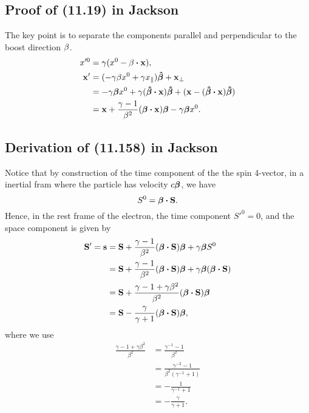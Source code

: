 \documentclass[10pt]{article}
\begin{document}
\subsection{Proof of (11.19) in Jackson}
The key point is to separate the components parallel and perpendicular to the boost direction $\vb{\beta}$.
\begin{align*}
	x'^0 &= \gamma (x^0 - \vb{\beta} \vdot \vb{x}), \\
	\vb{x'} &= (- \gamma \beta x^0 + \gamma x_{\parallel}) \vu*{\beta} + \vb{x}_{\perp} \\
	&= -\gamma \vb*{\beta} x^0 + \gamma (\vu*{\beta} \vdot \vb{x}) \vu*{\beta} + (\vb{x} - (\vu*{\beta} \vdot \vb{x}) \vu*{\beta}) \\
	&= \vb{x} + \frac{\gamma - 1}{\beta^2} (\vb*{\beta} \vdot \vb{x}) \vb*{\beta} - \gamma \vb*{\beta} x^0.
\end{align*}

\subsection{Derivation of (11.158) in Jackson}
Notice that by construction of the time component of the the spin 4-vector, in a inertial fram where the particle has velocity $c \vb*{\beta}$, we have
\begin{equation}
	S^0 = \vb*{\beta} \vdot \vb{S}.
\end{equation}
Hence, in the rest frame of the electron, the time component $S'^0 = 0$, and the space component is given by
\begin{align*}
	\vb{S'} = \vb{s} &= \vb{S} + \frac{\gamma - 1}{\beta^2} (\vb*{\beta} \vdot \vb{S}) \vb*{\beta} + \gamma \vb*{\beta} S^0 \\
	&= \vb{S} + \frac{\gamma - 1}{\beta^2} (\vb*{\beta} \vdot \vb{S}) \vb*{\beta} + \gamma \vb*{\beta} (\vb*{\beta} \vdot \vb{S})\\
	&= \vb{S} + \frac{\gamma - 1 + \gamma \beta^2}{\beta^2} (\vb*{\beta} \vdot \vb{S}) \vb*{\beta} \\
	&= \vb{S} - \frac{\gamma}{\gamma + 1} (\vb*{\beta} \vdot \vb{S}) \vb*{\beta},
\end{align*}
where we use
\begin{align*}
	\frac{\gamma - 1 + \gamma \beta^2}{\beta^2} &= \frac{\gamma^{-1} -1}{\beta^2} \\
	&= \frac{\gamma^{-2} -1}{\beta^2 (\gamma^{-1} +1)} \\
	&= - \frac{1}{\gamma^{-1} + 1} \\
	&= - \frac{\gamma}{\gamma + 1}.
\end{align*}
\end{document}
